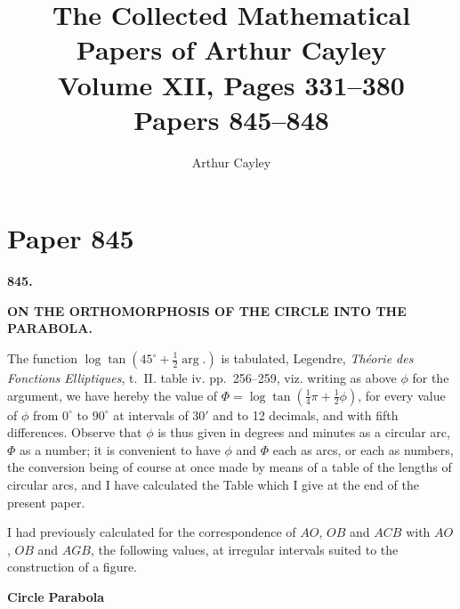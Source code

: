 \documentclass[11pt,a4paper]{article}
\title{\textbf{The Collected Mathematical Papers of Arthur Cayley}\\[6pt]
\Large Volume XII, Pages 331--380\\[4pt]
\large Papers 845--848}
\author{Arthur Cayley}
\date{}
\theoremstyle{definition}
\begin{document}
\maketitle
\thispagestyle{empty}

\tableofcontents
\newpage

\section{Paper 845}

\begin{center}
\large\textbf{845.}

\Large\textbf{ON THE ORTHOMORPHOSIS OF THE CIRCLE INTO THE PARABOLA.}

\end{center}

\bigskip

The function $\log \tan(45^\circ + \frac{1}{2}\arg.)$ is tabulated, Legendre, \textit{Th\'{e}orie des Fonctions Elliptiques}, t.~II. table iv. pp.~256--259, viz. writing as above $\phi$ for the argument, we have hereby the value of $\Phi = \log \tan(\frac{1}{4}\pi + \frac{1}{2}\phi)$, for every value of $\phi$ from $0^\circ$ to $90^\circ$ at intervals of $30'$ and to 12 decimals, and with fifth differences. Observe that $\phi$ is thus given in degrees and minutes as a circular arc, $\Phi$ as a number; it is convenient to have $\phi$ and $\Phi$ each as arcs, or each as numbers, the conversion being of course at once made by means of a table of the lengths of circular arcs, and I have calculated the Table which I give at the end of the present paper.

I had previously calculated for the correspondence of $AO$, $OB$ and $ACB$ with $AO$, $OB$ and $AGB$, the following values, at irregular intervals suited to the construction of a figure.

\bigskip

\textbf{Circle} \hfill \textbf{Parabola}

\medskip
\end{document}
